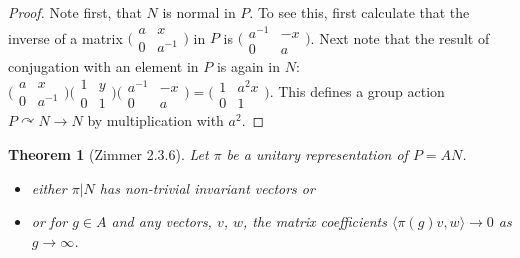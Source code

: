 \documentclass[
  12pt
]{article}
\newtheorem{thm}{Theorem}[section]
\theoremstyle{plain}
\newtheorem*{proof}{Proof}
\newcommand{\mpi}{\ensuremath{\pi}\xspace}
\newcommand{\ipmatrix}[1]{%
\ensuremath{\big(\begin{smallmatrix} #1 \end{smallmatrix}\big)}\xspace}
\begin{document}
\begin{proof}
    Note first, that $N$ is normal in $P$. To see this, first calculate that the
    inverse of a matrix $\ipmatrix{ a & x \\ 0 & a^{-1} }$ in $P$ is $\ipmatrix{
    a^{-1} & -x \\ 0 & a }$. Next note that the result of conjugation with an
    element in $P$ is again in $N$: $\ipmatrix{ a & x \\ 0 & a^{-1} } \ipmatrix{1 &
    y \\ 0 & 1} \ipmatrix{ a^{-1} & -x \\ 0 & a } = \ipmatrix{1 & a^2x \\ 0 & 1}$.
    This defines a group action $P \curvearrowright N \rightarrow N$ by
    multiplication with $a^2$.
  \end{proof}

  \begin{thm}[Zimmer 2.3.6]
    \label{thm:2.3.6}
    Let \mpi be  a unitary representation of $P = AN$.
    \begin{itemize}
      \item either $\pi|N$ has non-trivial invariant vectors or
      \item or for $g \in A$ and any vectors, $v$, $w$, the matrix coefficients
        $\langle \pi(g)v, w \rangle \rightarrow 0$ as $g \rightarrow \infty$.
    \end{itemize}
  \end{thm}
\end{document}
